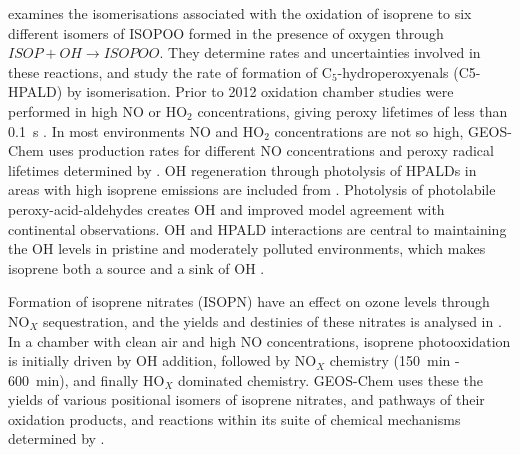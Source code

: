     \textcite{Crounse2011} examines the isomerisations associated with the oxidation of isoprene to six different isomers of ISOPOO formed in the presence of oxygen through $ISOP + OH \to ISOPOO$.
    They determine rates and uncertainties involved in these reactions, and study the rate of formation of C$_5$-hydroperoxyenals (C5-HPALD) by isomerisation.
    Prior to 2012 oxidation chamber studies were performed in high NO or HO$_2$ concentrations, giving peroxy lifetimes of less than 0.1~s \parencite{Crounse2012,Wolfe2012}.
    In most environments NO and HO$_2$ concentrations are not so high, GEOS-Chem uses production rates for different NO concentrations and peroxy radical lifetimes determined by \textcite{Crounse2012}.
    OH regeneration through photolysis of HPALDs in areas with high isoprene emissions are included from \textcite{Peeters2010}.
    Photolysis of photolabile peroxy-acid-aldehydes creates OH and improved model agreement with continental observations.
    OH and HPALD interactions are central to maintaining the OH levels in pristine and moderately polluted environments, which makes isoprene both a source and a sink of OH \parencite{Peeters2010,Taraborrelli2012}.
    
    Formation of isoprene nitrates (ISOPN) have an effect on ozone levels through NO$_X$ sequestration, and the yields and destinies of these nitrates is analysed in \textcite{Paulot2009a}.
    In a chamber with clean air and high NO concentrations, isoprene photooxidation is initially driven by OH addition, followed by NO$_X$ chemistry (150~min - 600~min), and finally HO$_X$ dominated chemistry.
    GEOS-Chem uses these the yields of various positional isomers of isoprene nitrates, and pathways of their oxidation products, and reactions within its suite of chemical mechanisms determined by \textcite{Paulot2009a,Mao2013}.
    
